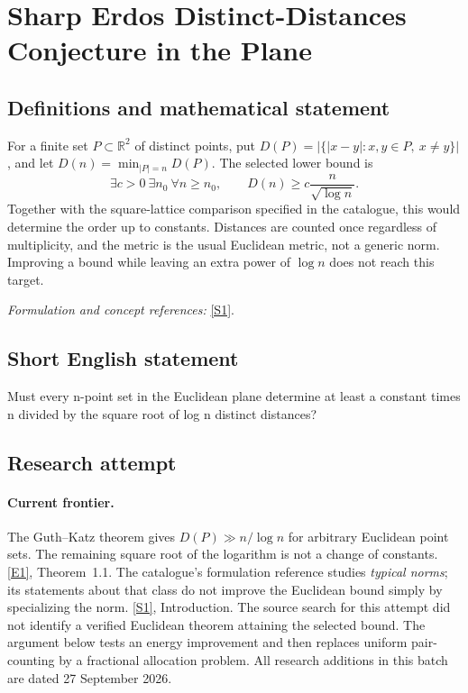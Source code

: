 \documentclass[11pt,a4paper]{article}
\newcommand{\R}{\mathbb{R}}
\newcommand{\sref}[2]{\hyperlink{source:#1:#2}{[S#2]}}
\newcommand{\eref}[2]{\hyperlink{extra:#1:#2}{[E#2]}}
\newif\ifshowcatalogue
\newcommand{\cataloguescope}[1]{\ifshowcatalogue
 \paragraph{Exact scope in the supplied catalogue.}
 \begin{quote}\small #1\end{quote}\fi}
\numberwithin{equation}{section}
\begin{document}
\setcounter{section}{217}
\clearpage
\section{\texorpdfstring{Sharp Erdos Distinct-Distances Conjecture in the Plane}{Sharp Erdos Distinct-Distances Conjecture in the Plane}}\label{218}
\subsection{Definitions and mathematical statement}
For a finite set $P\subset\R^2$ of distinct points, put
$D(P)=|\{|x-y|:x,y\in P,\ x\ne y\}|$, and let
$D(n)=\min_{|P|=n}D(P)$. The selected lower bound is
\[
 \exists c>0\ \exists n_0\ \forall n\ge n_0,
 \qquad D(n)\ge c\frac{n}{\sqrt{\log n}}.
\]
Together with the square-lattice comparison specified in the catalogue, this would determine the order up to constants. Distances are counted once regardless of multiplicity, and the metric is the usual Euclidean metric, not a generic norm. Improving a bound while leaving an extra power of $\log n$ does not reach this target.
\par\smallskip\textit{Formulation and concept references:} \sref{218}{1}.
\cataloguescope{Let D(n) be the minimum, over all sets of n distinct points in the Euclidean plane, of the number of distinct pairwise distances determined by the set. Prove D(n) = Omega(n/sqrt(log n)), matching up to a constant factor the square-lattice construction D(n) = O(n/sqrt(log n)).}
\subsection{Short English statement}
Must every n-point set in the Euclidean plane determine at least a constant times n divided by the square root of log n distinct distances?
\subsection{Research attempt}

\paragraph{Current frontier.}
The Guth--Katz theorem gives $D(P)\gg n/\log n$ for arbitrary Euclidean
point sets. The remaining square root of the logarithm is not a change
of constants. \eref{218}{1}, Theorem~1.1.
The catalogue's formulation reference studies \emph{typical norms}; its
statements about that class do not improve the Euclidean bound simply by
specializing the norm. \sref{218}{1}, Introduction. The source search for
this attempt did not identify a verified Euclidean theorem attaining the
selected bound. The argument below tests an energy improvement and then
replaces uniform pair-counting by a fractional allocation problem.
All research additions in this batch are dated 27 September 2026.
\end{document}
